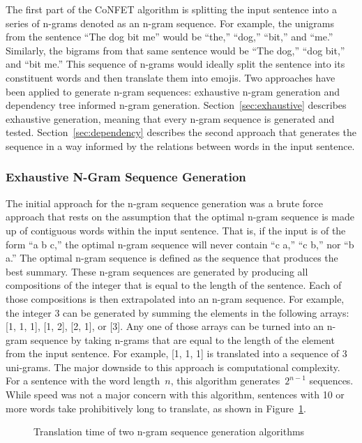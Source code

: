\documentclass{article}[10]
\begin{document}
The first part of the CoNFET algorithm is splitting the input sentence into a
series of n-grams denoted as an n-gram sequence. For example, the unigrams from
the sentence ``The dog bit me'' would be ``the,'' ``dog,'' ``bit,'' and ``me.''
Similarly, the bigrams from that same sentence would be ``The dog,'' ``dog
bit,'' and ``bit me.'' This sequence of n-grams would ideally split the sentence
into its constituent words and then translate them into emojis. Two approaches
have been applied to generate n-gram sequences: exhaustive n-gram generation and
dependency tree informed n-gram generation. Section~\ref{sec:exhaustive}
describes exhaustive generation, meaning that every n-gram sequence is generated
and tested. Section~\ref{sec:dependency} describes the second approach that
generates the sequence in a way informed by the relations between words in the
input sentence.

\subsubsection{Exhaustive N-Gram Sequence Generation\label{sec:exhaustive}}

The initial approach for the n-gram sequence generation was a brute force
approach that rests on the assumption that the optimal n-gram sequence is made
up of contiguous words within the input sentence. That is, if the input is of
the form ``a b c,'' the optimal n-gram sequence will never contain ``c a,'' ``c
b,'' nor ``b a.'' The optimal n-gram sequence is defined as the sequence that
produces the best summary. These n-gram sequences are generated by producing all
compositions of the integer that is equal to the length of the sentence. Each of
those compositions is then extrapolated into an n-gram sequence. For example,
the integer 3 can be generated by summing the elements in the following arrays:
[1, 1, 1], [1, 2], [2, 1], or [3]. Any one of those arrays can be turned into an
n-gram sequence by taking n-grams that are equal to the length of the element
from the input sentence. For example, [1, 1, 1] is translated into a sequence of
3 uni-grams. The major downside to this approach is computational complexity.
For a sentence with the word length~\(n\), this algorithm generates~\(2^{n-1}\)
sequences. While speed was not a major concern with this algorithm, sentences
with 10 or more words take prohibitively long to translate, as shown in
Figure~\ref{fig:timing}.

\begin{figure}[h]
  \begin{center}
    \scalebox{0.6}{}
    \caption{Translation time of two n-gram sequence generation
      algorithms\label{fig:timing}}
  \end{center}
\end{figure}
\end{document}
